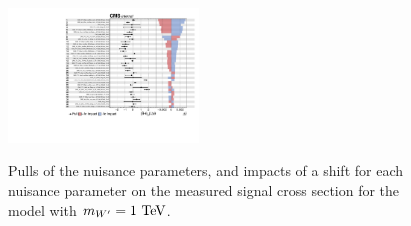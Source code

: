 \begin{figure}[htbp]
  \includegraphics[width=0.45\textwidth,page=6]{fig/fitValidation/impacts_WprToWH1000_6p_72.pdf}\\
  \caption{
    Pulls of the nuisance parameters, and impacts of a shift for each nuisance parameter on the measured signal cross section for the \DY\WprtoWH model with $m_{\Wpr}=1\unit{TeV}$.
  }
  \label{fig:impacts_WprToWH}
\end{figure}


